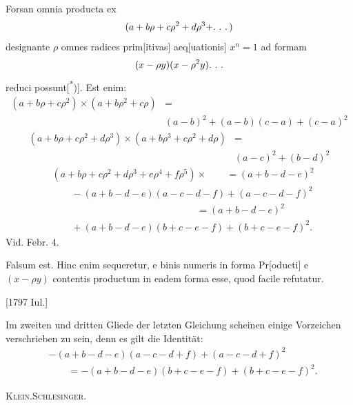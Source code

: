 \indent Forsan omnia producta ex
\[
(a+b\rho+c\rho^2+d\rho^3+\ldotp\,\ldotp\,\ldotp)
\]
\noindent designante \(\rho\) omnes radices prim[itivas] aeq[uationis] \(x^n=1\) ad formam
\[
(x-\rho y)(x-\rho^2y)\ldotp\,\ldotp\,\ldotp
\]
\noindent reduci possunt[\textsuperscript{*})]\begingroup\renewcommand{\thefootnote}{[*)}\footnotetext{In der Handschrift steht \textls[120]{potest}.]}\endgroup. Est enim:
\[
\begin{aligned}
(a+b\rho+c\rho^2)\times(a+b\rho^2+c\rho)&={}\\
&(a-b)^2+(a-b)(c-a)+(c-a)^2
\end{aligned}
\]
\[
\begin{aligned}
(a+b\rho+c\rho^2+d\rho^3)\times(a+b\rho^3+c\rho^2+d\rho)&={}\\
&(a-c)^2+(b-d)^2
\end{aligned}
\]
\[
\begin{aligned}
&(a+b\rho+c\rho^2+d\rho^3+e\rho^4+f\rho^5)\times\qquad=(a+b-d-e)^2\\
&\qquad-(a+b-d-e)(a-c-d-f)+(a-c-d-f)^2\\
&\hspace{15em}=(a+b-d-e)^2\\
&\qquad+(a+b-d-e)(b+c-e-f)+(b+c-e-f)^2.
\end{aligned}
\]
\noindent\hfill Vid. Febr. 4.

\indent Falsum est. Hinc enim sequeretur, e binis numeris in forma Pr[oducti] e \((x-\rho y)\) contentis productum in eadem forma esse, quod facile refutatur.
\par\noindent\hfill[1797 Iul.]

\medskip\begingroup\small
\indent Im zweiten und dritten Gliede der letzten Gleichung scheinen einige Vorzeichen verschrieben zu sein, denn es gilt die Identität:
\[
\begin{aligned}
&-(a+b-d-e)(a-c-d+f)+(a-c-d+f)^2\\
&\qquad=-(a+b-d-e)(b+c-e-f)+(b+c-e-f)^2.
\end{aligned}
\]
\par\noindent\hfill\textsc{Klein.\quad Schlesinger.}
\par\endgroup
